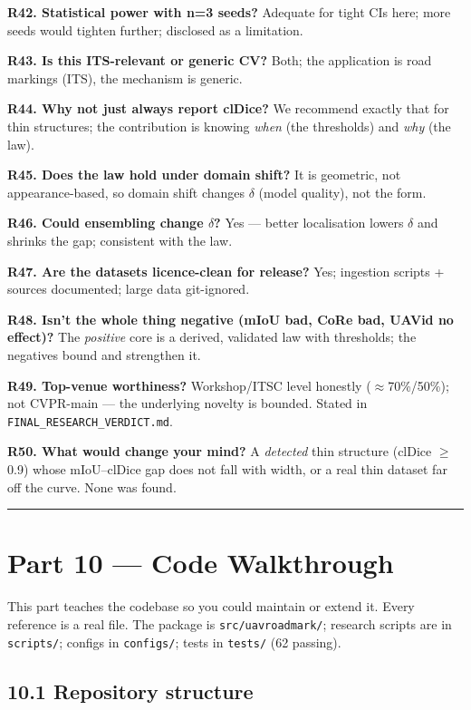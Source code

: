 \documentclass[11pt]{article}
\begin{document}
\textbf{R42. Statistical power with n=3 seeds?} Adequate for tight CIs here; more seeds would tighten further; disclosed as a limitation.

\textbf{R43. Is this ITS-relevant or generic CV?} Both; the application is road markings (ITS), the mechanism is generic.

\textbf{R44. Why not just always report clDice?} We recommend exactly that for thin structures; the contribution is knowing \textit{when} (the thresholds) and \textit{why} (the law).

\textbf{R45. Does the law hold under domain shift?} It is geometric, not appearance-based, so domain shift changes $\delta$ (model quality), not the form.

\textbf{R46. Could ensembling change $\delta$?} Yes --- better localisation lowers $\delta$ and shrinks the gap; consistent with the law.

\textbf{R47. Are the datasets licence-clean for release?} Yes; ingestion scripts + sources documented; large data git-ignored.

\textbf{R48. Isn't the whole thing negative (mIoU bad, CoRe bad, UAVid no effect)?} The \textit{positive} core is a derived, validated law with thresholds; the negatives bound and strengthen it.

\textbf{R49. Top-venue worthiness?} Workshop/ITSC level honestly ($\approx$70\%/50\%); not CVPR-main --- the underlying novelty is bounded. Stated in \texttt{FINAL\_RESEARCH\_VERDICT.md}.

\textbf{R50. What would change your mind?} A \textit{detected} thin structure (clDice $\geq$ 0.9) whose mIoU--clDice gap does not fall with width, or a real thin dataset far off the curve. None was found.

\vspace{3pt}\hrule\vspace{3pt}
\clearpage\section*{Part 10 --- Code Walkthrough}

This part teaches the codebase so you could maintain or extend it. Every reference is a real file. The package is \texttt{src/uavroadmark/}; research scripts are in \texttt{scripts/}; configs in \texttt{configs/}; tests in \texttt{tests/} (62 passing).

\subsection*{10.1 Repository structure}
\end{document}
